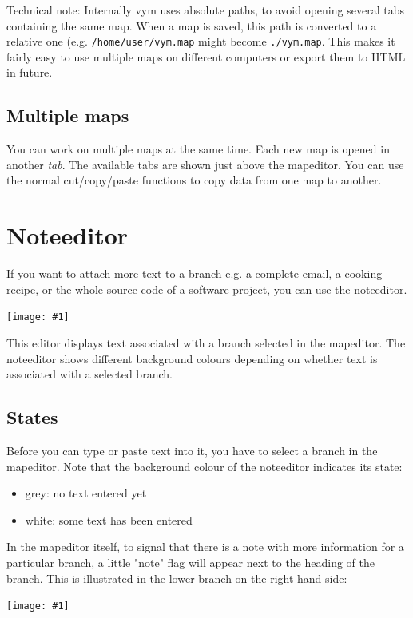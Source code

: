 \documentclass[12pt,a4paper]{article}
\newcommand{\maximage}[1]{  
    \begin{center}
        \texttt{[image: \#1]} 
    \end{center}
}
\newcommand{\vym}{{\sc vym }}
\begin{document}
Technical note: Internally \vym uses absolute paths, to avoid opening
several tabs containing the same map. When a map is saved, this path is
converted to a relative one (e.g. {\tt /home/user/vym.map} might become
{\tt ./vym.map}. This makes it fairly easy to use multiple maps on
different computers or export them to HTML in future.

\subsection{Multiple maps} \label{tabs}
You can work on multiple maps at the same time. Each new map is opened
in another {\em tab}. The available tabs are shown just above the
mapeditor. You can use the normal cut/copy/paste functions to
copy data from one map to another.




\section{Noteeditor} \label {noteeditor}
If you want to attach more text to a branch e.g. a complete email, a
cooking recipe, or the whole source code of a software project, you can
use the noteeditor. 
    \maximage{images/noteeditor.png}
This editor displays text associated with a branch selected in the mapeditor. The noteeditor
shows different background colours depending on whether text is associated with a selected branch.

\subsection{States}
Before you can type or paste text into it, you have
to select a branch in the mapeditor. Note that the background colour
of the noteeditor indicates its state:
\begin{itemize}
    \item grey: no text entered yet
    \item white: some text has been entered
\end{itemize}   
In the mapeditor itself, to signal that there is a note with more
information for a particular branch, a little "note" flag will appear next
to the heading of the branch. This is illustrated in the lower branch on the right hand side:
    \maximage{images/branches-flags.png}
\end{document}
